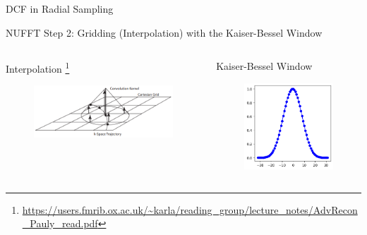 \begin{frame}{DCF in Radial Sampling}
\end{frame}


\begin{frame}{NUFFT Step 2: Gridding (Interpolation) with the Kaiser-Bessel Window}

    \begin{columns}
	\begin{column}{0.65\textwidth}
		\centering
		Interpolation  \footnote{\url{https://users.fmrib.ox.ac.uk/~karla/reading_group/lecture_notes/AdvRecon_Pauly_read.pdf}}
		\begin{figure}
			\includegraphics[width=\columnwidth]{fig/interp.png}
		\end{figure}
	\end{column}
	
	\begin{column}{0.30\textwidth}
		\centering
		Kaiser-Bessel Window
		\begin{figure}
			\includegraphics[width=\columnwidth]{fig/kb.png}
		\end{figure}
	\end{column}
	\end{columns}

\end{frame}


